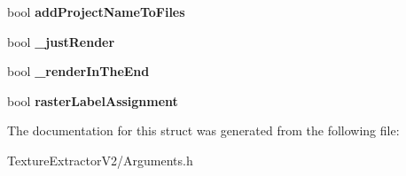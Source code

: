 \begin{DoxyCompactItemize}
\item 
\hypertarget{struct_arguments_a5438dd5f419d88e72ba7dad3e7343229}{}bool {\bfseries add\+Project\+Name\+To\+Files}\label{struct_arguments_a5438dd5f419d88e72ba7dad3e7343229}

\item 
\hypertarget{struct_arguments_a425be50cc8828826b939677321ae98dc}{}bool {\bfseries \+\_\+just\+Render}\label{struct_arguments_a425be50cc8828826b939677321ae98dc}

\item 
\hypertarget{struct_arguments_ada75eb1bead23d95007b7a757050015e}{}bool {\bfseries \+\_\+render\+In\+The\+End}\label{struct_arguments_ada75eb1bead23d95007b7a757050015e}

\item 
\hypertarget{struct_arguments_ae808c944e2083f6a3f6763e13bf2b268}{}bool {\bfseries raster\+Label\+Assignment}\label{struct_arguments_ae808c944e2083f6a3f6763e13bf2b268}

\end{DoxyCompactItemize}


The documentation for this struct was generated from the following file\+:\begin{DoxyCompactItemize}
\item 
Texture\+Extractor\+V2/Arguments.\+h\end{DoxyCompactItemize}
